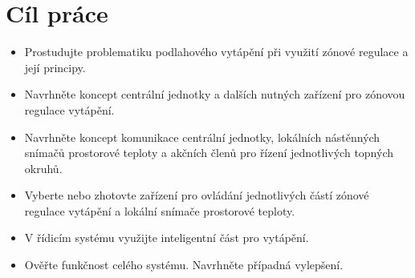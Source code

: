 \section{Cíl práce}
\begin{itemize}
\item Prostudujte problematiku podlahového vytápění při využití zónové regulace a její principy.
\item Navrhněte koncept centrální jednotky a dalších nutných zařízení pro zónovou regulace vytápění.
\item Navrhněte koncept komunikace centrální jednotky, lokálních nástěnných snímačů prostorové teploty a akčních členů pro řízení jednotlivých topných okruhů.
\item Vyberte nebo zhotovte zařízení pro ovládání jednotlivých částí zónové regulace vytápění a lokální snímače prostorové teploty.
\item V řídicím systému využijte inteligentní část pro vytápění.
\item Ověřte funkčnost celého systému. Navrhněte případná vylepšení.

\end{itemize}